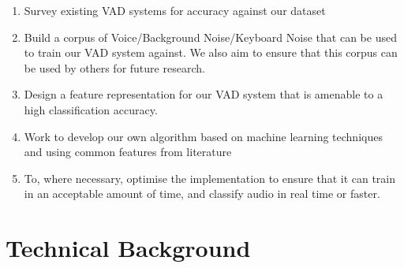 \documentclass[ %
                    author={Sam Phippen},
                supervisor={Dr. Rafal Bogacz},
                     title={Real time voice activity detectors in noisy personal computing environments},
                  subtitle={},
                    degree={MEng},
                      year={2012} ]{thesis}
\begin{document}
\begin{enumerate}

    \item Survey existing VAD systems for accuracy against our dataset

    \item Build a corpus of Voice/Background Noise/Keyboard Noise that can be
        used to train our VAD system against. We also aim to ensure that this
        corpus can be used by others for future research.

    \item Design a feature representation for our VAD system that is amenable
        to a high classification accuracy.

    \item Work to develop our own algorithm based on machine learning
        techniques and using common features from literature

    \item To, where necessary, optimise the implementation to ensure that it
        can train in an acceptable amount of time, and classify audio in real
        time or faster.

\end{enumerate}




\chapter{Technical Background}
\label{chap:technical}

\vspace{1cm} 

\noindent

%
\end{document}
